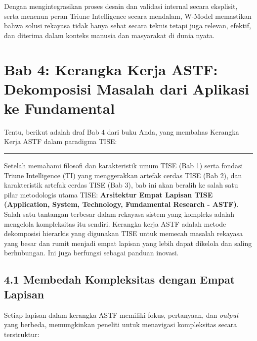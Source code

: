 \documentclass[
  letterpaper,
  DIV=11,
  numbers=noendperiod]{scrreprt}
\begin{document}
Dengan mengintegrasikan proses desain dan validasi internal secara
eksplisit, serta menenun peran Triune Intelligence secara mendalam,
W-Model memastikan bahwa solusi rekayasa tidak hanya sehat secara teknis
tetapi juga relevan, efektif, dan diterima dalam konteks manusia dan
masyarakat di dunia nyata.


\chapter{\texorpdfstring{\textbf{Bab 4: Kerangka Kerja ASTF: Dekomposisi
Masalah dari Aplikasi ke
Fundamental}}{Bab 4: Kerangka Kerja ASTF: Dekomposisi Masalah dari Aplikasi ke Fundamental}}\label{bab-4-kerangka-kerja-astf-dekomposisi-masalah-dari-aplikasi-ke-fundamental}

Tentu, berikut adalah draf Bab 4 dari buku Anda, yang membahas Kerangka
Kerja ASTF dalam paradigma TISE:

\begin{center}\rule{0.5\linewidth}{0.5pt}\end{center}

Setelah memahami filosofi dan karakteristik umum TISE (Bab 1) serta
fondasi Triune Intelligence (TI) yang menggerakkan artefak cerdas TISE
(Bab 2), dan karakteristik artefak cerdas TISE (Bab 3), bab ini akan
beralih ke salah satu pilar metodologis utama TISE: \textbf{Arsitektur
Empat Lapisan TISE (Application, System, Technology, Fundamental
Research - ASTF)}. Salah satu tantangan terbesar dalam rekayasa sistem
yang kompleks adalah mengelola kompleksitas itu sendiri. Kerangka kerja
ASTF adalah metode dekomposisi hierarkis yang digunakan TISE untuk
memecah masalah rekayasa yang besar dan rumit menjadi empat lapisan yang
lebih dapat dikelola dan saling berhubungan. Ini juga berfungsi sebagai
panduan inovasi.

\section{\texorpdfstring{\textbf{4.1 Membedah Kompleksitas dengan Empat
Lapisan}}{4.1 Membedah Kompleksitas dengan Empat Lapisan}}\label{membedah-kompleksitas-dengan-empat-lapisan}

Setiap lapisan dalam kerangka ASTF memiliki fokus, pertanyaan, dan
\emph{output} yang berbeda, memungkinkan peneliti untuk menavigasi
kompleksitas secara terstruktur:
\end{document}
